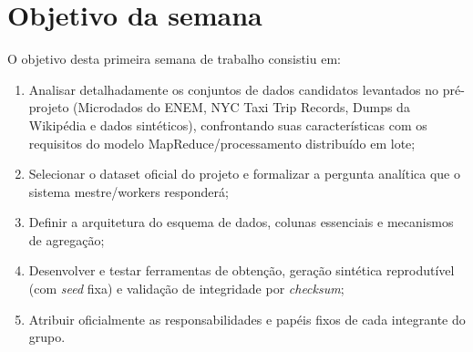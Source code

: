 \section{Objetivo da semana}

O objetivo desta primeira semana de trabalho consistiu em:
\begin{enumerate}
  \item Analisar detalhadamente os conjuntos de dados candidatos levantados
    no pré-projeto (Microdados do ENEM, NYC Taxi Trip Records, Dumps da
    Wikipédia e dados sintéticos), confrontando suas características com os
    requisitos do modelo MapReduce/processamento distribuído em lote;
  \item Selecionar o dataset oficial do projeto e formalizar a pergunta
    analítica que o sistema mestre/workers responderá;
  \item Definir a arquitetura do esquema de dados, colunas essenciais e
    mecanismos de agregação;
  \item Desenvolver e testar ferramentas de obtenção, geração sintética
    reprodutível (com \emph{seed} fixa) e validação de integridade por
    \emph{checksum};
  \item Atribuir oficialmente as responsabilidades e papéis fixos de cada
    integrante do grupo.
\end{enumerate}
